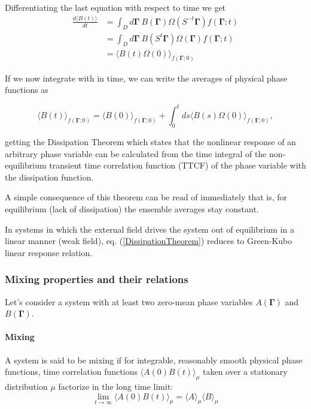 \documentclass[a4paper,12pt]{article}
\begin{document}
Differentiating the last equation with respect to time we get
\begin{equation}
\begin{aligned}
 \frac{d\langle B(t) \rangle}{dt}
 &= \int_D d\bm{\Gamma}\ B(\bm{\Gamma}) \Omega(S^{-t}\bm{\Gamma}) f(\bm{\Gamma};t)\\
&= \int_D d\bm{\Gamma}\ B(S^t \bm{\Gamma}) \Omega(\bm{\Gamma})f(\bm{\Gamma};t)\\
&= \langle B(t)\Omega(0) \rangle_{f(\bm{\Gamma};0)}
\end{aligned}
\end{equation}

If we now integrate with in time, we can write the averages of physical phase functions as

\begin{equation}
\label{DissipationTheorem}
\langle B(t)\rangle_{f(\bm{\Gamma};0)} =\langle B(0) \rangle_{f(\bm{\Gamma};0)} +\int_0^t ds \langle B(s) \Omega(0) \rangle_{f(\bm{\Gamma};0)}, 
\end{equation}

getting the Dissipation Theorem which states that the nonlinear response of an arbitrary phase variable can be calculated from the time integral of the non-equilibrium transient time correlation function (TTCF) of the phase variable with the dissipation function.




A simple consequence of this theorem can be read of immediately that is, for equilibrium (lack of dissipation) the ensemble averages stay constant.

In systems in which the external field drives the system out of equilibrium in a linear manner (weak field), eq. (\ref{DissipationTheorem}) reduces to Green-Kubo linear response relation.

\subsubsection{Mixing properties and their relations}

Let's consider a system with at least two zero-mean phase variables $A(\bm{\Gamma})$ and $B(\bm{\Gamma})$. 

\paragraph{Mixing}

A system is said to be mixing if for integrable, reasonably smooth physical phase functions, time correlation functions $\langle A(0) B(t) \rangle_{\mu}$ taken over a stationary distribution $\mu$ factorize in the long time limit:
\begin{equation}
  \lim_{t \to \infty} \langle A(0) B(t)\rangle_{\mu} = \langle A \rangle_{\mu} \langle B \rangle_{\mu}  
\end{equation}
\end{document}
